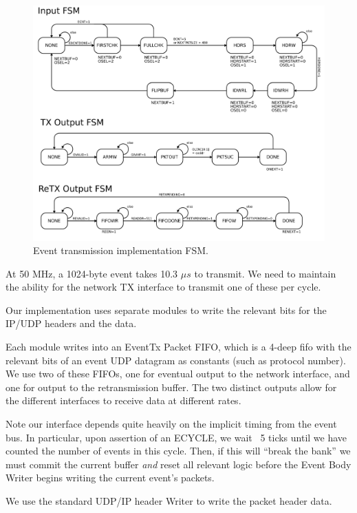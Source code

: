 \begin{figure}
\begin{centering}
\includegraphics[scale=0.8]{eventtx.fsm.svg}
\end{centering}
\caption{Event transmission implementation FSM.}
\label{eventtx.fsm}
\end{figure}

At 50 MHz, a 1024-byte event takes 10.3 $\mu s$ to transmit. We need to
maintain the ability for the network TX interface to transmit one of
these per cycle.

Our implementation uses separate modules to write the relevant bits for
the IP/UDP headers and the data. 

Each module writes into an EventTx Packet FIFO, which is a 4-deep fifo
with the relevant bits of an event UDP datagram as constants (such as
protocol number). We use two of these FIFOs, one for eventual output
to the network interface, and one for output to the retransmission
buffer. The two distinct outputs allow for the different interfaces to
receive data at different rates.

Note our interface depends quite heavily on the implicit timing from
the event bus. In particular, upon assertion of an ECYCLE, we wait ~5
ticks until we have counted the number of events in this cycle. Then,
if this will ``break the bank'' we must commit the current buffer
\textit{and} reset all relevant logic before the Event Body Writer
begins writing the current event's packets.

We use the standard UDP/IP header Writer to write the packet header data. 

